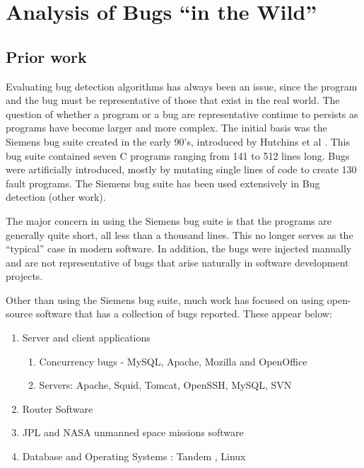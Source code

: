 \section{Analysis of Bugs ``in the Wild''} \label{fault_analysis}

\subsection{Prior work}

Evaluating bug detection algorithms has always been an issue, since
the program and the bug must be representative of those that exist in
the real world. The question of whether a program or a bug are
representative continue to persists as programs have become larger and
more complex. The initial basis was the Siemens bug suite created in
the early 90's, introduced by Hutchins et al \cite{hutchins1994}. This bug suite
contained seven C programs ranging from 141 to 512 lines long. Bugs were
artificially introduced, mostly by mutating single lines of code to
create 130 fault programs. The Siemens bug suite has been used
extensively in Bug detection \cite{fei_argus_2006} (other work).

The major concern in using the Siemens bug suite is that the programs
are generally quite short, all less than a thousand lines. This no
longer serves as the ``typical'' case in modern software. In addition,
the bugs were injected manually and are not representative of bugs
that arise naturally in software development projects. 

Other than using the Siemens bug suite, much work has focused on using
open-source software that has a collection of bugs reported. These
appear below:

\begin{enumerate}
\item Server and client applications
  \begin{enumerate}
    \item Concurrency bugs - MySQL, Apache, Mozilla and OpenOffice
      \cite{lu_learning_2008} \cite{fonseca_study_2010}
    \item Servers: Apache, Squid, Tomcat, OpenSSH, MySQL, SVN
      \cite{sahoo_empirical_2010} \cite{Li2006}
  \end{enumerate}
  \item Router Software \cite{yin_towards_2010}
  \item JPL and NASA unmanned space missions software
    \cite{grottke_empirical_2010}
  \item Database and Operating Systems : Tandem \cite{sullivan_software_1991}
    \cite{chillarege_orthogonal_1992}, Linux \cite{Tan2013}
\end{enumerate}

